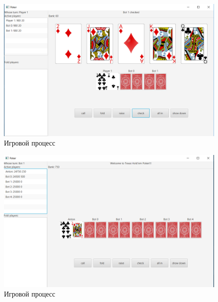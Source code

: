 \begin{figure}[H]
	\begin{center}
		\includegraphics[scale=0.5]{pics/3.png}
	    \caption{Игровой процесс} 
		\label{pic:gui:3}
	\end{center}
\end{figure}

\begin{figure}[H]
	\begin{center}
		\includegraphics[scale=0.5]{pics/4.png}
	    \caption{Игровой процесс} 
		\label{pic:gui:4}
	\end{center}
\end{figure}

